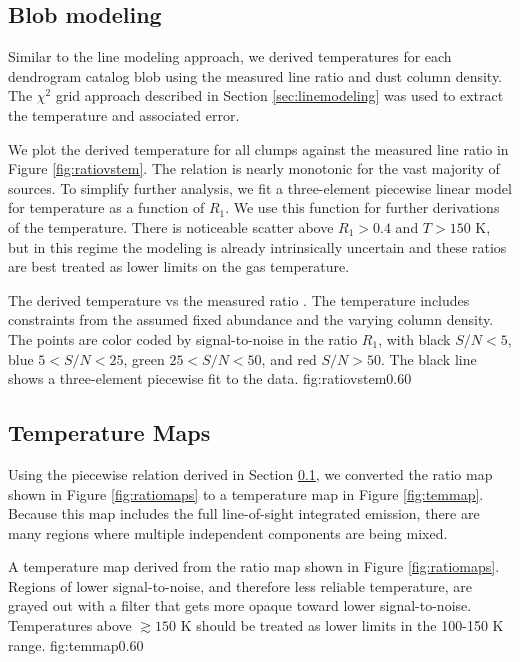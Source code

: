 \subsection{Blob modeling}
\label{sec:dendromod}
Similar to the line modeling approach, we derived temperatures for each
dendrogram catalog blob using the measured line ratio and dust column density.
The $\chi^2$ grid approach described in Section \ref{sec:linemodeling} was used
to extract the temperature and associated error.

We plot the derived temperature for all clumps against the measured line ratio
in Figure \ref{fig:ratiovstem}.  The relation is nearly monotonic for the vast
majority of sources.  To simplify further analysis, we fit a three-element
piecewise linear model for temperature as a function of $R_1$.  We use this
function for further derivations of the temperature.  There is noticeable
scatter above $R_1 > 0.4$ and $T>150$ K, but in this regime the modeling is
already intrinsically uncertain and these ratios are best treated as lower
limits on the gas temperature.

{The derived temperature vs the measured ratio \Rone.  The temperature
includes constraints from the assumed fixed \formaldehyde abundance and the 
varying column density.  The points are color coded by signal-to-noise in the
ratio $R_1$, with black $S/N < 5$, blue $5 < S/N < 25$, green $25 < S/N < 50$,
and red $S/N > 50$.  The black line shows a three-element piecewise fit
to the data.
}
{fig:ratiovstem}{0.6}{0}

\subsection{Temperature Maps}
\label{sec:formaldehydetemmap}
Using the piecewise relation derived in Section \ref{sec:dendromod}, we
converted the ratio map shown in Figure \ref{fig:ratiomaps} to a temperature
map in Figure \ref{fig:temmap}.  Because this map includes the full line-of-sight
integrated emission, there are many regions where multiple independent components
are being mixed.

{A temperature map derived from the \Rone ratio map shown
in Figure \ref{fig:ratiomaps}.  Regions of lower signal-to-noise, and therefore less
reliable temperature, are grayed out with a filter that gets more opaque
toward lower signal-to-noise.  Temperatures above $\gtrsim150$ K should be
treated as lower limits in the 100-150 K range.
}
{fig:temmap}{0.6}{0}



